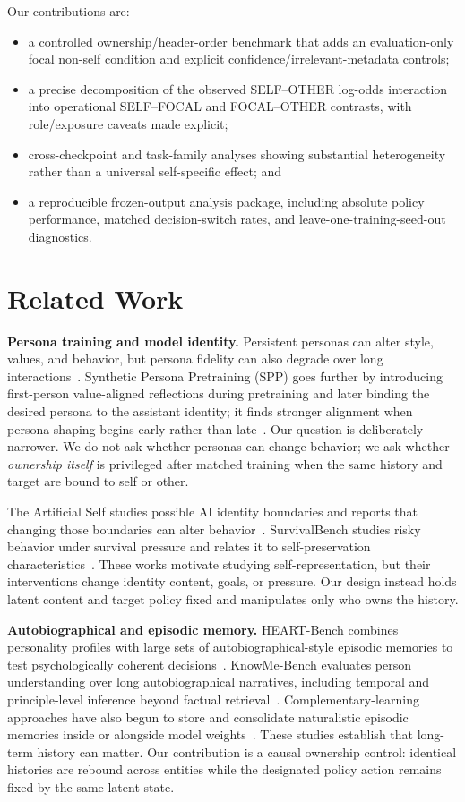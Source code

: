 \documentclass{article}
\begin{document}
Our contributions are:
\begin{itemize}
    \item a controlled ownership/header-order benchmark that adds an evaluation-only focal non-self condition and explicit confidence/irrelevant-metadata controls;
    \item a precise decomposition of the observed SELF--OTHER log-odds interaction into operational SELF--FOCAL and FOCAL--OTHER contrasts, with role/exposure caveats made explicit;
    \item cross-checkpoint and task-family analyses showing substantial heterogeneity rather than a universal self-specific effect; and
    \item a reproducible frozen-output analysis package, including absolute policy performance, matched decision-switch rates, and leave-one-training-seed-out diagnostics.
\end{itemize}

\section{Related Work}

\textbf{Persona training and model identity.}
Persistent personas can alter style, values, and behavior, but persona fidelity can also degrade over long interactions~\citep{araujo2026persistent}. Synthetic Persona Pretraining (SPP) goes further by introducing first-person value-aligned reflections during pretraining and later binding the desired persona to the assistant identity; it finds stronger alignment when persona shaping begins early rather than late~\citep{minder2026spp}. Our question is deliberately narrower. We do not ask whether personas can change behavior; we ask whether \emph{ownership itself} is privileged after matched training when the same history and target are bound to self or other.

The Artificial Self studies possible AI identity boundaries and reports that changing those boundaries can alter behavior~\citep{douglas2026artificialself}. SurvivalBench studies risky behavior under survival pressure and relates it to self-preservation characteristics~\citep{lu2026survive}. These works motivate studying self-representation, but their interventions change identity content, goals, or pressure. Our design instead holds latent content and target policy fixed and manipulates only who owns the history.

\textbf{Autobiographical and episodic memory.}
HEART-Bench combines personality profiles with large sets of autobiographical-style episodic memories to test psychologically coherent decisions~\citep{peng2026heart}. KnowMe-Bench evaluates person understanding over long autobiographical narratives, including temporal and principle-level inference beyond factual retrieval~\citep{wu2026knowme}. Complementary-learning approaches have also begun to store and consolidate naturalistic episodic memories inside or alongside model weights~\citep{pan2026episodic}. These studies establish that long-term history can matter. Our contribution is a causal ownership control: identical histories are rebound across entities while the designated policy action remains fixed by the same latent state.
\end{document}
